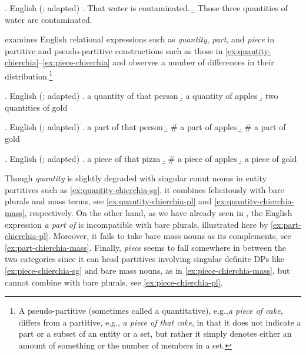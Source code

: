  \ex. English (\citealt{chierchia2010mass}; adapted)\label{ex:mass-quantity}
 \a. That water is contaminated.\label{ex:mass-uncountable}
 \b. Those three quantities of water are contaminated.\label{ex:mass-quantity-countable} 

\citeauthor{chierchia2010mass} examines English relational expressions such as \textit{quantity}, \textit{part}, and \textit{piece} in partitive and pseudo-partitive constructions such as those in \ref{ex:quantity-chierchia}--\ref{ex:piece-chierchia} and observes a number of differences in their distribution.\footnote{A pseudo-partitive (sometimes called a quantitative), e.g.,\textit{a piece of cake}, differs from a partitive, e.g., \textit{a piece of that cake}, in that it does not indicate a part or a subset of an entity or a set, but rather it simply denotes either an amount of something or the number of members in a set.}

  	\ex. English (\citealt{chierchia2010mass}; adapted)\label{ex:quantity-chierchia}
  	\a. a quantity of that person\label{ex:quantity-chierchia-sg}
  	\b. a quantity of apples\label{ex:quantity-chierchia-pl}   
	\b. two quantities of gold\label{ex:quantity-chierchia-mass}
    
    \ex. English (\citealt{chierchia2010mass}; adapted)\label{ex:part-chierchia}
	\a. a part of that person
	\b. \# a part of apples\label{ex:part-chierchia-pl}
	\b. \# a part of gold\label{ex:part-chierchia-mass}
    
    \ex. English (\citealt{chierchia2010mass}; adapted)\label{ex:piece-chierchia}
  	\a. a piece of that pizza\label{ex:piece-chierchia-sg}
  	\b. \# a piece of apples\label{ex:piece-chierchia-pl}
	\b. a piece of gold\label{ex:piece-chierchia-mass}

Though \textit{quantity} is slightly degraded with singular count nouns in entity partitives such as \ref{ex:quantity-chierchia-sg}, it combines felicitously with bare plurals and mass terms, see \ref{ex:quantity-chierchia-pl} and \ref{ex:quantity-chierchia-mass}, respectively. On the other hand, as we have already seen in , the English expression \textit{a part of} is incompatible with bare plurals, illustrated here by \ref{ex:part-chierchia-pl}. Moreover, it fails to take bare mass nouns as its complements, see \ref{ex:part-chierchia-mass}. Finally, \textit{piece} seems to fall somewhere in between the two categories since it can head partitives involving singular definite DPs like \ref{ex:piece-chierchia-sg} and bare mass nouns, as in \ref{ex:piece-chierchia-mass}, but cannot combine with bare plurals, see \ref{ex:piece-chierchia-pl}.

